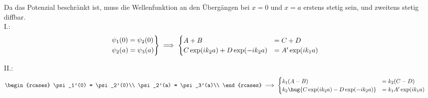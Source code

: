 \documentclass[ex,minted]{exercise_4.0}
\begin{document}
Da das Potenzial beschränkt ist, muss die Wellenfunktion an den Übergängen bei \(x=0\) und \(x=a\) erstens stetig sein, und zweitens stetig diffbar.\\

I.:
\begin{align*}
    \begin{rcases}
        \psi_1(0) = \psi_2(0)\\
        \psi_2(a) = \psi_3(a)\\
    \end{rcases}\implies 
    \begin{cases}
        A+B &= C + D\\
        C\exp(ik_2a) + D\exp(-ik_2a) &= A'\exp(ik_1a)
    \end{cases}
\end{align*}


II.:
\begin{align*}
    \begin{rcases}
        \psi_1'(0) = \psi_2'(0)\\
        \psi_2'(a) = \psi_3'(a)\\
    \end{rcases}\implies 
    \begin{cases}
        k_1(A-B) &= k_2(C - D)\\
        k_2\hug{C\exp(ik_2a) - D\exp(-ik_2a)} &= k_1 A'\exp(ik_1a)
    \end{cases}
\end{align*}


\end{document}
